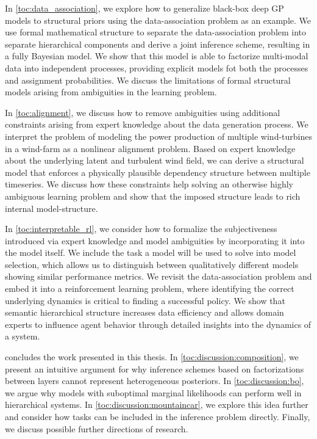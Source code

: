 In \cref{toc:data_association}, we explore how to generalize black-box deep GP models to structural priors using the data-association problem as an example.
We use formal mathematical structure to separate the data-association problem into separate hierarchical components and derive a joint inference scheme, resulting in a fully Bayesian model.
We show that this model is able to factorize multi-modal data into independent processes, providing explicit models fot both the processes and assignment probabilities.
We discuss the limitations of formal structural models arising from ambiguities in the learning problem.

In \cref{toc:alignment}, we discuss how to remove ambiguities using additional constraints arising from expert knowledge about the data generation process.
We interpret the problem of modeling the power production of multiple wind-turbines in a wind-farm as a nonlinear alignment problem.
Based on expert knowledge about the underlying latent and turbulent wind field, we can derive a structural model that enforces a physically plausible dependency structure between multiple timeseries.
We discuss how these constraints help solving an otherwise highly ambiguous learning problem and show that the imposed structure leads to rich internal model-structure.

In \cref{toc:interpretable_rl}, we consider how to formalize the subjectiveness introduced via expert knowledge and model ambiguities by incorporating it into the model itself.
We include the task a model will be used to solve into model selection, which allows us to distinguish between qualitatively different models showing similar performance metrics.
We revisit the data-association problem and embed it into a reinforcement learning problem, where identifying the correct underlying dynamics is critical to finding a successful policy.
We show that semantic hierarchical structure increases data efficiency and allows domain experts to influence agent behavior through detailed insights into the dynamics of a system.

 concludes the work presented in this thesis.
In \cref{toc:discussion:composition}, we present an intuitive argument for why inference schemes based on factorizations between layers cannot represent heterogeneous posteriors.
In \cref{toc:discussion:bo}, we argue why models with suboptimal marginal likelihoods can perform well in hierarchical systems.
In \cref{toc:discussion:mountaincar}, we explore this idea further and consider how tasks can be included in the inference problem directly.
Finally, we discuss possible further directions of research.

